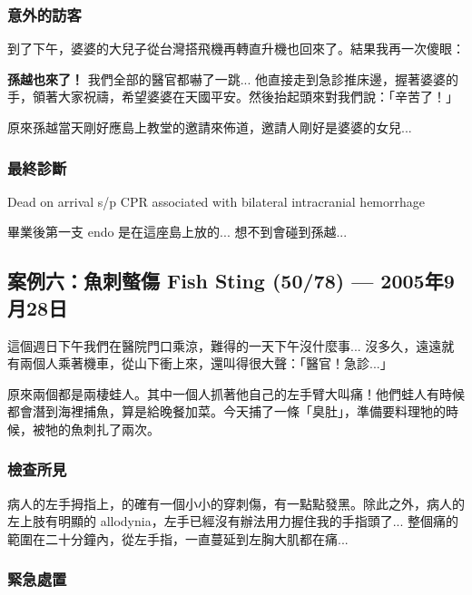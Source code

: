 \documentclass[12pt,a4paper]{article}
\newenvironment{myquote}{%
    \begin{tcolorbox}[
        colback=quote_bg,
        colframe=emergency_gray,
        boxrule=0pt,
        leftrule=3pt,
        arc=0pt,
        left=10pt,
        right=10pt,
        top=8pt,
        bottom=8pt
    ]
    \itshape
}{%
    \end{tcolorbox}
}
\begin{document}
\subsubsection{意外的訪客}

到了下午，婆婆的大兒子從台灣搭飛機再轉直升機也回來了。結果我再一次傻眼：

\textbf{孫越也來了！} 我們全部的醫官都嚇了一跳... 他直接走到急診推床邊，握著婆婆的手，領著大家祝禱，希望婆婆在天國平安。然後抬起頭來對我們說：「辛苦了！」

原來孫越當天剛好應島上教堂的邀請來佈道，邀請人剛好是婆婆的女兒...

\subsubsection{最終診斷}

\begin{tcolorbox}[
    colback=emergency_gray!10!white,
    colframe=emergency_gray,
    title=\textbf{Diagnosis},
    fonttitle=\bfseries
]
Dead on arrival s/p CPR associated with bilateral intracranial hemorrhage
\end{tcolorbox}

\begin{myquote}
畢業後第一支 endo 是在這座島上放的... 想不到會碰到孫越...
\end{myquote}

\subsection{案例六：魚刺螫傷 Fish Sting (50/78) — 2005年9月28日}

這個週日下午我們在醫院門口乘涼，難得的一天下午沒什麼事... 沒多久，遠遠就有兩個人乘著機車，從山下衝上來，還叫得很大聲：「醫官！急診...」

原來兩個都是兩棲蛙人。其中一個人抓著他自己的左手臂大叫痛！他們蛙人有時候都會潛到海裡捕魚，算是給晚餐加菜。今天捕了一條「臭肚」，準備要料理牠的時候，被牠的魚刺扎了兩次。

\subsubsection{檢查所見}

病人的左手拇指上，的確有一個小小的穿刺傷，有一點點發黑。除此之外，病人的左上肢有明顯的 allodynia，左手已經沒有辦法用力握住我的手指頭了... 整個痛的範圍在二十分鐘內，從左手指，一直蔓延到左胸大肌都在痛...

\subsubsection{緊急處置}
\end{document}
